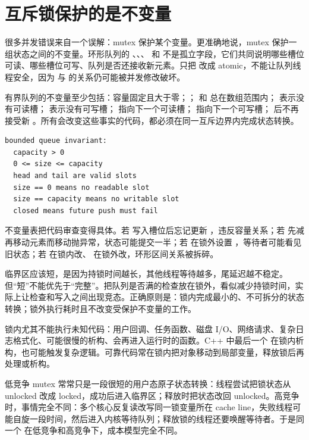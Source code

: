 \section{互斥锁保护的是不变量}

很多并发错误来自一个误解：mutex 保护某个变量。更准确地说，mutex 保护一组状态之间的不变量。环形队列的 、、、 和  不是孤立字段，它们共同说明哪些槽位可读、哪些槽位可写、队列是否还接收新元素。只把  改成 atomic，不能让队列线程安全，因为  与  的关系仍可能被并发修改破坏。

有界队列的不变量至少包括：容量固定且大于零；； 和  总在数组范围内； 表示没有可读槽； 表示没有可写槽； 指向下一个可读槽； 指向下一个可写槽； 后不再接受新 。所有会改变这些事实的代码，都必须在同一互斥边界内完成状态转换。

\begin{lstlisting}[numbers=none,caption={有界队列的不变量不是注释装饰，而是代码审查依据}]
bounded queue invariant:
  capacity > 0
  0 <= size <= capacity
  head and tail are valid slots
  size == 0 means no readable slot
  size == capacity means no writable slot
  closed means future push must fail
\end{lstlisting}

不变量表把代码审查变得具体。若  写入槽位后忘记更新 ，违反容量关系；若  先减  再移动元素而移动抛异常，状态可能提交一半；若  在锁外设置 ，等待者可能看见旧状态；若  在锁内改、 在锁外改，环形区间关系被拆碎。

临界区应该短，是因为持锁时间越长，其他线程等待越多，尾延迟越不稳定。但“短”不能优先于“完整”。把队列是否满的检查放在锁外，看似减少持锁时间，实际上让检查和写入之间出现竞态。正确原则是：锁内完成最小的、不可拆分的状态转换；锁外执行耗时且不改变受保护不变量的工作。

锁内尤其不能执行未知代码：用户回调、任务函数、磁盘 I/O、网络请求、复杂日志格式化、可能很慢的析构、会再进入运行时的函数。C++ 中最后一个  在锁内析构，也可能触发复杂逻辑。可靠代码常在锁内把对象移动到局部变量，释放锁后再处理或析构。

低竞争 mutex 常常只是一段很短的用户态原子状态转换：线程尝试把锁状态从 unlocked 改成 locked，成功后进入临界区；释放时把状态改回 unlocked。高竞争时，事情完全不同：多个核心反复读改写同一锁变量所在 cache line，失败线程可能自旋一段时间，然后进入内核等待队列；释放锁的线程还要唤醒等待者。于是同一个  在低竞争和高竞争下，成本模型完全不同。

